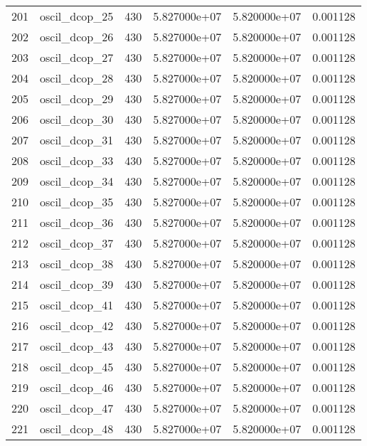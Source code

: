 \documentclass[8pt]{report}
\begin{document}
\begin{table*}
\begin{tabular}{|l|c|r|r|r|r|}
201 &            oscil\_dcop\_25 &   430 &  5.827000e+07 &  5.820000e+07 &  0.001128 \\
202 &            oscil\_dcop\_26 &   430 &  5.827000e+07 &  5.820000e+07 &  0.001128 \\
203 &            oscil\_dcop\_27 &   430 &  5.827000e+07 &  5.820000e+07 &  0.001128 \\
204 &            oscil\_dcop\_28 &   430 &  5.827000e+07 &  5.820000e+07 &  0.001128 \\
205 &            oscil\_dcop\_29 &   430 &  5.827000e+07 &  5.820000e+07 &  0.001128 \\
206 &            oscil\_dcop\_30 &   430 &  5.827000e+07 &  5.820000e+07 &  0.001128 \\
207 &            oscil\_dcop\_31 &   430 &  5.827000e+07 &  5.820000e+07 &  0.001128 \\
208 &            oscil\_dcop\_33 &   430 &  5.827000e+07 &  5.820000e+07 &  0.001128 \\
209 &            oscil\_dcop\_34 &   430 &  5.827000e+07 &  5.820000e+07 &  0.001128 \\
210 &            oscil\_dcop\_35 &   430 &  5.827000e+07 &  5.820000e+07 &  0.001128 \\
211 &            oscil\_dcop\_36 &   430 &  5.827000e+07 &  5.820000e+07 &  0.001128 \\
212 &            oscil\_dcop\_37 &   430 &  5.827000e+07 &  5.820000e+07 &  0.001128 \\
213 &            oscil\_dcop\_38 &   430 &  5.827000e+07 &  5.820000e+07 &  0.001128 \\
214 &            oscil\_dcop\_39 &   430 &  5.827000e+07 &  5.820000e+07 &  0.001128 \\
215 &            oscil\_dcop\_41 &   430 &  5.827000e+07 &  5.820000e+07 &  0.001128 \\
216 &            oscil\_dcop\_42 &   430 &  5.827000e+07 &  5.820000e+07 &  0.001128 \\
217 &            oscil\_dcop\_43 &   430 &  5.827000e+07 &  5.820000e+07 &  0.001128 \\
218 &            oscil\_dcop\_45 &   430 &  5.827000e+07 &  5.820000e+07 &  0.001128 \\
219 &            oscil\_dcop\_46 &   430 &  5.827000e+07 &  5.820000e+07 &  0.001128 \\
220 &            oscil\_dcop\_47 &   430 &  5.827000e+07 &  5.820000e+07 &  0.001128 \\
221 &            oscil\_dcop\_48 &   430 &  5.827000e+07 &  5.820000e+07 &  0.001128 \\

\end{tabular}
\end{table*}
\end{document}
